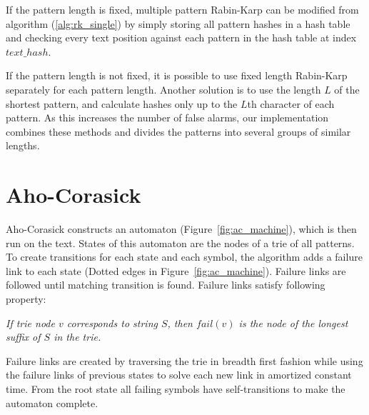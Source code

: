 \documentclass[final]{beamer}
\begin{document}
\begin{poster}
\vspace{5mm}
If the pattern length is fixed, multiple pattern Rabin-Karp can be modified from algorithm (\ref{alg:rk_single}) by simply storing all pattern hashes in a hash table and checking every text position against each pattern in the hash table at index $text\_hash$.

If the pattern length is not fixed, it is possible to use fixed length Rabin-Karp separately for each pattern length. Another solution is to use the length $L$ of the shortest pattern, and calculate hashes only up to the $L$th character of each pattern. As this increases the number of false alarms, our implementation combines these methods and divides the patterns into several groups of similar lengths.

\newcolumn

\section{Aho-Corasick}

Aho-Corasick constructs an automaton (Figure~\ref{fig:ac_machine}), which is then run on the text.
States of this automaton are the nodes of a trie of all patterns.
To create transitions for each state and each symbol, the algorithm adds a failure link to each state
(Dotted edges in Figure~\ref{fig:ac_machine}).
Failure links are followed until matching transition is found.
Failure links satisfy following property:

\begin{shaded}
\textit{
If trie node $v$ corresponds to string $S$, then
$fail(v)$ is the node of the longest suffix of $S$ in the trie.
}
\end{shaded}

\vspace{5mm}

Failure links are created by traversing the trie in breadth first fashion
while using the failure links of previous states to solve each new
link in amortized constant time.
From the root state all failing symbols have self-transitions to make the automaton complete.


\end{poster}
\end{document}
